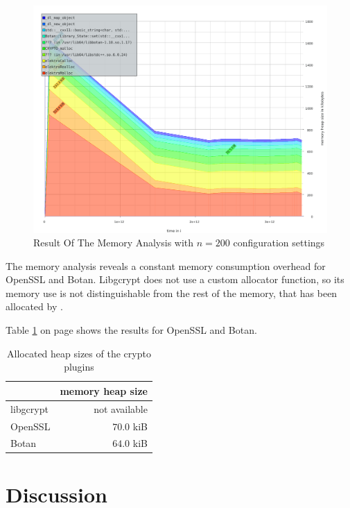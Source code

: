 \begin{figure}
\center
\caption{Result Of The Memory Analysis with $n = 200$ configuration settings}
\label{eval-massif-200}
\includegraphics[width=\columnwidth]{plots/massif_200.pdf}
\end{figure}

The memory analysis reveals a constant memory consumption overhead for OpenSSL and Botan.
Libgcrypt does not use a custom allocator function, so its memory use is not distinguishable from the rest of the memory, that has been allocated by \elektra .

Table \ref{eval-mem-res} on page \pageref{eval-mem-res} shows the results for OpenSSL and Botan.

\begin{table}[h]
\centering
\caption{Allocated heap sizes of the crypto plugins}
\label{eval-mem-res}
\begin{tabular}{l|r}
          & memory heap size \\ \hline
libgcrypt & not available    \\
OpenSSL   & $70.0$ kiB       \\
Botan     & $64.0$ kiB      
\end{tabular}
\end{table}

\section{Discussion}

